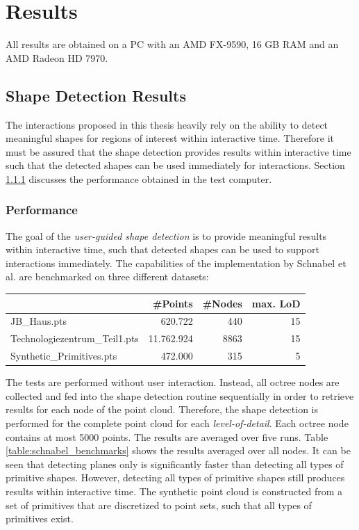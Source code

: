 \chapter{Results}
\label{chap:results}


All results are obtained on a PC with an AMD FX-9590, 16 GB RAM and an AMD Radeon HD 7970. 


\section{Shape Detection Results}

The interactions proposed in this thesis heavily rely on the ability to detect meaningful shapes for regions of interest within interactive time. Therefore it must be assured that the shape detection provides results within interactive time such that the detected shapes can be used immediately for interactions. Section \ref{sec:shape_detection_performance} discusses the performance obtained in the test computer. 


\subsection{Performance}

\label{sec:shape_detection_performance}

The goal of the \textit{user-guided shape detection} is to provide meaningful results within interactive time, such that detected shapes can be used to support interactions immediately. The capabilities of the implementation by Schnabel et al.\cite{schnabel-2007-software} are benchmarked on three different datasets: 

\begin{center}
\begin{tabular}{ l | r | r | r }
																& \textbf{\#Points} 			& \textbf{\#Nodes} & \textbf{max. LoD} \\
	\hline
  JB\_Haus.pts									& 620.722 								& 440 			& 15 \\
  Technologiezentrum\_Teil1.pts	& 11.762.924							& 8863 			& 15 \\
  Synthetic\_Primitives.pts 		& 472.000 								& 315	 			& 5 \\
	
\end{tabular}
\end{center}

The tests are performed without user interaction. Instead, all octree nodes are collected and fed into the shape detection routine sequentially in order to retrieve results for each node of the point cloud. Therefore, the shape detection is performed for the complete point cloud for each \textit{level-of-detail}. Each octree node contains at most 5000 points. The results are averaged over five runs. Table \ref{table:schnabel_benchmarks} shows the results averaged over all nodes. It can be seen that detecting planes only is significantly faster than detecting all types of primitive shapes. However, detecting all types of primitive shapes still produces results within interactive time. The synthetic point cloud is constructed from a set of primitives that are discretized to point sets, such that all types of primitives exist. 

